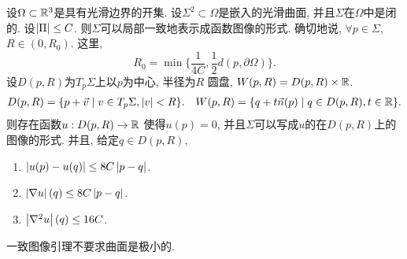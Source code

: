 \begin{lemma}[一致图像引理] \label{uniform_graph}
    设$\Omega \subset \mathbb{R}^3$是具有光滑边界的开集. 设$\Sigma^2 \subset \Omega$是嵌入的光滑曲面, 并且$\Sigma$在$\Omega$中是闭的. 设$\left | {\Pi} \right | \le C$. 则$\Sigma$可以局部一致地表示成函数图像的形式. 确切地说, $\forall p \in \Sigma$, $R\in (0,R_0)$. 这里, 
    \begin{equation}
        R_0=\min\{\frac{1}{4C}, \frac{1}{2}d(p,\partial \Omega)\}.
    \end{equation}
    设$D(p,R)$为$T_p\Sigma$上以$p$为中心, 半径为$R$ 圆盘, $W(p,R)=D(p,R)\times \mathbb{R}$. 
    \begin{align}
        &D(p,R)= \{p+\vec{v}\mid v \in T_p\Sigma, \left | v \right | < R\}. 
        &W(p,R)= \{q+t\vec{n}(p)\mid q \in D(p,R), t \in \mathbb{R}\}.
    \end{align}
    则存在函数$u: D(p,R)\to \mathbb{R}$ 使得$u(p)=0$, 并且$\Sigma$可以写成$u$的在$D(p,R)$上的图像的形式. 并且, 给定$q \in D(p,R)$,
    \begin{enumerate}
        \item $\left | u(p)-u(q) \right | \le 8C\left | p-q \right |$.
        \item $\left | \nabla u \right |(q) \le 8C\left | p-q \right |$.
        \item $\left | \nabla^2 u \right |(q) \le 16C$.
    \end{enumerate}
\end{lemma}
\begin{remark}
    一致图像引理不要求曲面是极小的.
\end{remark}
